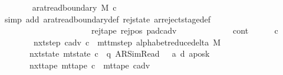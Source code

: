 \begin{isabellebody}
\ \ \ \ \ \ \isamarkupfalse%
\ {\isachardoublequoteopen}ar{\isacharunderscore}{\kern0pt}at{\isacharunderscore}{\kern0pt}read{\isacharunderscore}{\kern0pt}boundary\ M\ c{\isacharprime}{\kern0pt}{\isacharprime}{\kern0pt}{\isachardoublequoteclose}\isanewline
\ \ \ \ \ \ \ \ \isamarkupfalse%
\ {\isacharparenleft}{\kern0pt}simp\ add{\isacharcolon}{\kern0pt}\ ar{\isacharunderscore}{\kern0pt}at{\isacharunderscore}{\kern0pt}read{\isacharunderscore}{\kern0pt}boundary{\isacharunderscore}{\kern0pt}def\ rej{\isacharunderscore}{\kern0pt}state\ ar{\isacharunderscore}{\kern0pt}reject{\isacharunderscore}{\kern0pt}stage{\isacharunderscore}{\kern0pt}def\isanewline
\ \ \ \ \ \ \ \ \ \ \ \ \ \ \ \ \ \ \ \ \ \ rej{\isacharunderscore}{\kern0pt}tape\ rej{\isacharunderscore}{\kern0pt}pos\ pad{\isacharunderscore}{\kern0pt}cadv{\isacharparenright}{\kern0pt}\isanewline
\ \ \ \ \isamarkupfalse%
\isanewline
\ \ \isamarkupfalse%
\isanewline
\ \ \ \ \isamarkupfalse%
\ cont\isanewline
\ \ \ \ \isamarkupfalse%
\ c{\isacharprime}{\kern0pt}{\isacharprime}{\kern0pt}\ \isanewline
\ \ \ \ \ \ \ \ nxt{\isacharunderscore}{\kern0pt}step{\isacharcolon}{\kern0pt}\ {\isachardoublequoteopen}{\isacharparenleft}{\kern0pt}c{\isacharunderscore}{\kern0pt}adv{\isacharcomma}{\kern0pt}\ c{\isacharprime}{\kern0pt}{\isacharprime}{\kern0pt}{\isacharparenright}{\kern0pt}\ {\isasymin}\ mttm{\isacharunderscore}{\kern0pt}step\ {\isacharparenleft}{\kern0pt}alphabet{\isacharunderscore}{\kern0pt}reduce{\isacharunderscore}{\kern0pt}delta\ M{\isacharparenright}{\kern0pt}{\isachardoublequoteclose}\isanewline
\ \ \ \ \ \ \ nxt{\isacharunderscore}{\kern0pt}state{\isacharcolon}{\kern0pt}\ {\isachardoublequoteopen}mt{\isacharunderscore}{\kern0pt}state\ c{\isacharprime}{\kern0pt}{\isacharprime}{\kern0pt}\ {\isacharequal}{\kern0pt}\ {\isacharparenleft}{\kern0pt}q{\isacharprime}{\kern0pt}{\isacharcomma}{\kern0pt}\ AR{\isacharunderscore}{\kern0pt}SimRead{\isacharcomma}{\kern0pt}\ {}{\isacharcomma}{\kern0pt}\ {}{\isacharcomma}{\kern0pt}\ a{\isacharprime}{\kern0pt}{\isacharcomma}{\kern0pt}\ d{\isacharcomma}{\kern0pt}\ {\isacharquery}{\kern0pt}aposk{\isacharparenright}{\kern0pt}{\isachardoublequoteclose}\isanewline
\ \ \ \ \ \ \ nxt{\isacharunderscore}{\kern0pt}tape{\isacharcolon}{\kern0pt}\ {\isachardoublequoteopen}mt{\isacharunderscore}{\kern0pt}tape\ c{\isacharprime}{\kern0pt}{\isacharprime}{\kern0pt}\ {\isacharequal}{\kern0pt}\ mt{\isacharunderscore}{\kern0pt}tape\ c{\isacharunderscore}{\kern0pt}adv{\isachardoublequoteclose}\isanewline

\end{isabellebody}
